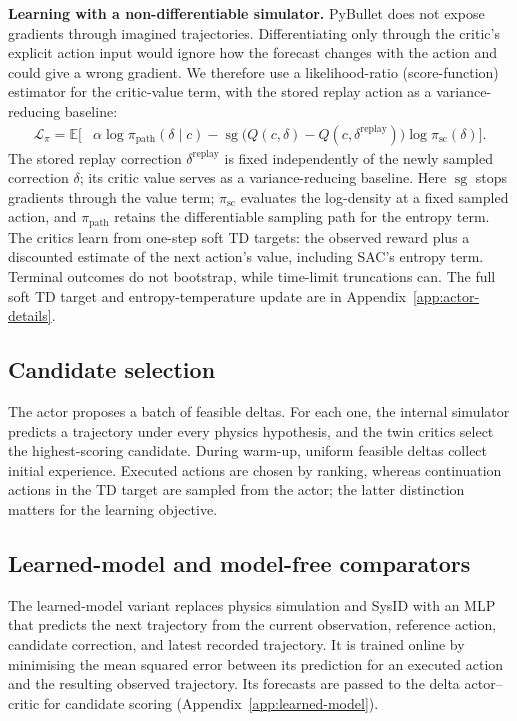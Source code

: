 \documentclass[12pt]{article}
\newcommand{\expect}{\mathbb{E}}
\newcommand{\sg}{\operatorname{sg}}
\begin{document}
\textbf{Learning with a non-differentiable simulator.} PyBullet does not expose gradients through imagined trajectories. Differentiating only through the critic's explicit action input would ignore how the forecast changes with the action and could give a wrong gradient. We therefore use a likelihood-ratio (score-function) estimator \cite{reinforce} for the critic-value term, with the stored replay action as a variance-reducing baseline:
\begin{equation}\begin{aligned}
\mathcal L_\pi=\expect\!\Big[&\alpha\log\pi_{\mathrm{path}}(\delta\mid c)-\sg\!\big(Q(c,\delta)-Q(c,\delta^{\mathrm{replay}})\big)\log\pi_{\mathrm{sc}}(\delta)\Big].
\end{aligned}\label{eq:actor}\end{equation}
The stored replay correction $\delta^{\mathrm{replay}}$ is fixed independently of the newly sampled correction $\delta$; its critic value serves as a variance-reducing baseline. Here $\sg$ stops gradients through the value term; $\pi_{\mathrm{sc}}$ evaluates the log-density at a fixed sampled action, and $\pi_{\mathrm{path}}$ retains the differentiable sampling path for the entropy term. The critics learn from one-step soft TD targets: the observed reward plus a discounted estimate of the next action's value, including SAC's entropy term. Terminal outcomes do not bootstrap, while time-limit truncations can. The full soft TD target and entropy-temperature update are in Appendix~\ref{app:actor-details}.

\subsection{Candidate selection}\label{sec:candidates}
The actor proposes a batch of feasible deltas. For each one, the internal simulator predicts a trajectory under every physics hypothesis, and the twin critics select the highest-scoring candidate. During warm-up, uniform feasible deltas collect initial experience. Executed actions are chosen by ranking, whereas continuation actions in the TD target are sampled from the actor; the latter distinction matters for the learning objective.

\subsection{Learned-model and model-free comparators}\label{sec:comparators}
The learned-model variant replaces physics simulation and SysID with an MLP that predicts the next trajectory from the current observation, reference action, candidate correction, and latest recorded trajectory. It is trained online by minimising the mean squared error between its prediction for an executed action and the resulting observed trajectory. Its forecasts are passed to the delta actor--critic for candidate scoring (Appendix~\ref{app:learned-model}).
\end{document}

